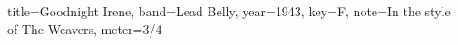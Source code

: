 \documentclass{skrul-leadsheet}
\begin{document}
\begin{song}[transpose-capo=true]{title={Goodnight Irene}, band={Lead Belly}, year={1943}, key={F}, note={In the style of The Weavers}, meter={3/4}}



\end{song}
\end{document}
